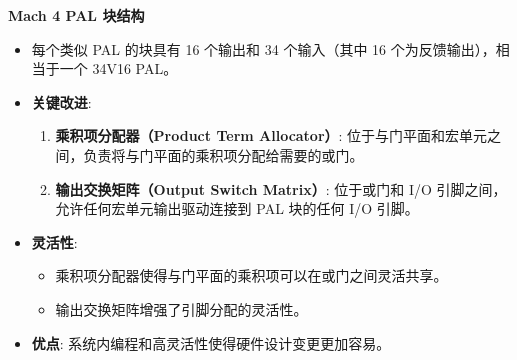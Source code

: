 \begin{frame}{\textbf{Mach 4 PAL 块结构}}

    \begin{itemize}
    \tightlist
    \item
    每个类似 PAL 的块具有 16 个输出和 34 个输入（其中 16
    个为反馈输出），相当于一个 34V16 PAL。
    \item
    \textbf{关键改进}:

    \begin{enumerate}
    \tightlist
    \item
        \textbf{乘积项分配器（Product Term Allocator）}:
        位于与门平面和宏单元之间，负责将与门平面的乘积项分配给需要的或门。
    \item
        \textbf{输出交换矩阵（Output Switch Matrix）}: 位于或门和 I/O
        引脚之间，允许任何宏单元输出驱动连接到 PAL 块的任何 I/O 引脚。
    \end{enumerate}
    \item
    \textbf{灵活性}:

    \begin{itemize}
    \tightlist
    \item
        乘积项分配器使得与门平面的乘积项可以在或门之间灵活共享。
    \item
        输出交换矩阵增强了引脚分配的灵活性。
    \end{itemize}
    \item
    \textbf{优点}: 系统内编程和高灵活性使得硬件设计变更更加容易。
    \end{itemize}
\end{frame}

